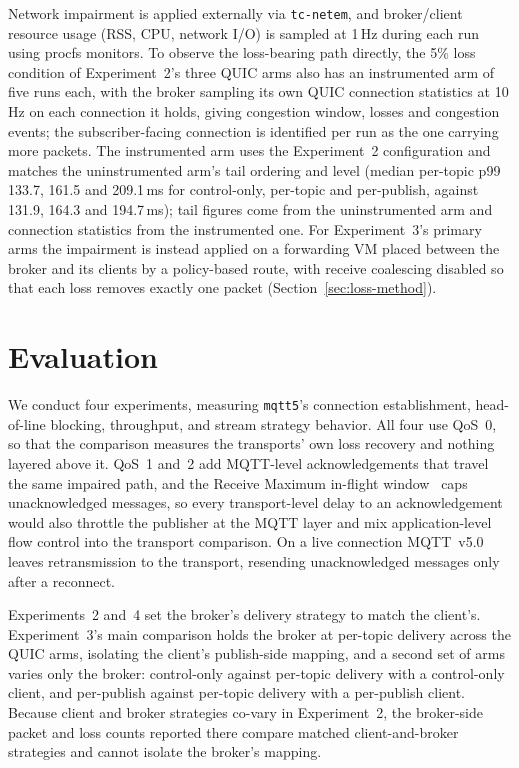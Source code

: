 \documentclass[a4paper,fleqn]{cas-dc}
\begin{document}
Network impairment is applied externally via \texttt{tc-netem}, and broker/client resource usage (RSS, CPU, network I/O) is sampled at 1\,Hz during each run using procfs monitors. To observe the loss-bearing path directly, the 5\% loss condition of Experiment~2's three QUIC arms also has an instrumented arm of five runs each, with the broker sampling its own QUIC connection statistics at 10\,Hz on each connection it holds, giving congestion window, losses and congestion events; the subscriber-facing connection is identified per run as the one carrying more packets. The instrumented arm uses the Experiment~2 configuration and matches the uninstrumented arm's tail ordering and level (median per-topic p99 133.7, 161.5 and 209.1\,ms for control-only, per-topic and per-publish, against 131.9, 164.3 and 194.7\,ms); tail figures come from the uninstrumented arm and connection statistics from the instrumented one. For Experiment~3's primary arms the impairment is instead applied on a forwarding VM placed between the broker and its clients by a policy-based route, with receive coalescing disabled so that each loss removes exactly one packet (Section~\ref{sec:loss-method}).


\section{Evaluation}
\label{sec:evaluation}

We conduct four experiments, measuring \texttt{mqtt5}'s connection establishment, head-of-line blocking, throughput, and stream strategy behavior. All four use QoS~0, so that the comparison measures the transports' own loss recovery and nothing layered above it. QoS~1 and~2 add MQTT-level acknowledgements that travel the same impaired path, and the Receive Maximum in-flight window~\cite{mqtt-v5-spec} caps unacknowledged messages, so every transport-level delay to an acknowledgement would also throttle the publisher at the MQTT layer and mix application-level flow control into the transport comparison. On a live connection MQTT~v5.0 leaves retransmission to the transport, resending unacknowledged messages only after a reconnect.

Experiments~2 and~4 set the broker's delivery strategy to match the client's. Experiment~3's main comparison holds the broker at per-topic delivery across the QUIC arms, isolating the client's publish-side mapping, and a second set of arms varies only the broker: control-only against per-topic delivery with a control-only client, and per-publish against per-topic delivery with a per-publish client. Because client and broker strategies co-vary in Experiment~2, the broker-side packet and loss counts reported there compare matched client-and-broker strategies and cannot isolate the broker's mapping.
\end{document}
